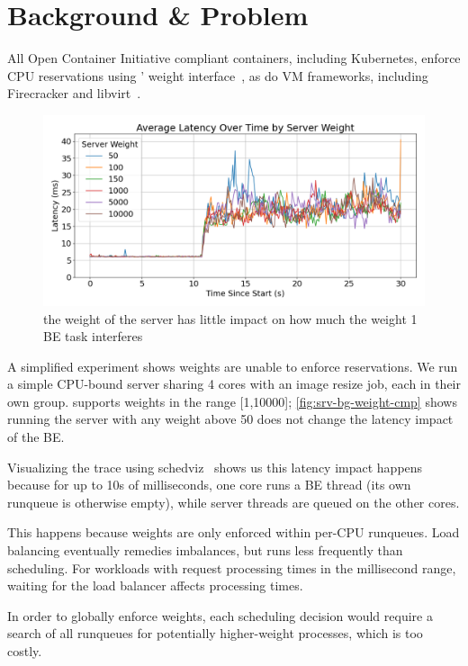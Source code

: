 
\section{Background \& Problem}

All Open Container Initiative compliant containers, including Kubernetes,
enforce CPU reservations using \cgroups{}' weight interface~\cite{oci-cgroups,
docker-docs-cgroups, container-isolation-article}, as do VM frameworks,
including Firecracker and
libvirt~\cite{firecracker-cgroups,afaas,libvirt-cgroups}. 

\begin{figure}[t]
    \centering
    \includegraphics[width=\columnwidth]{graphs/srv-bg-weight-cmp-low.png}
    \caption{ the weight of the server has little impact on how much the
    weight 1 BE task interferes }\label{fig:srv-bg-weight-cmp}
\end{figure}


A simplified experiment shows \cgroups{} weights are unable to enforce
reservations. We run a simple CPU-bound server sharing 4 cores with an image
resize job, each in their own group. \cgroups{} supports weights in the range
[1,10000]; \autoref{fig:srv-bg-weight-cmp} shows running the server with any
weight above 50 does not change the latency impact of the BE.

Visualizing the trace using schedviz~\cite{schedviz-tool} shows us this latency
impact happens because for up to 10s of milliseconds, one core runs a BE thread
(its own runqueue is otherwise empty), while server threads are queued on the
other cores.

This happens because weights are only enforced within per-CPU runqueues. Load
balancing eventually remedies imbalances, but runs less frequently than
scheduling. For workloads with request processing times in the millisecond
range, waiting for the load balancer affects processing times.

In order to globally enforce weights, each scheduling decision would require a
search of all runqueues for potentially higher-weight processes, which is too
costly. 




